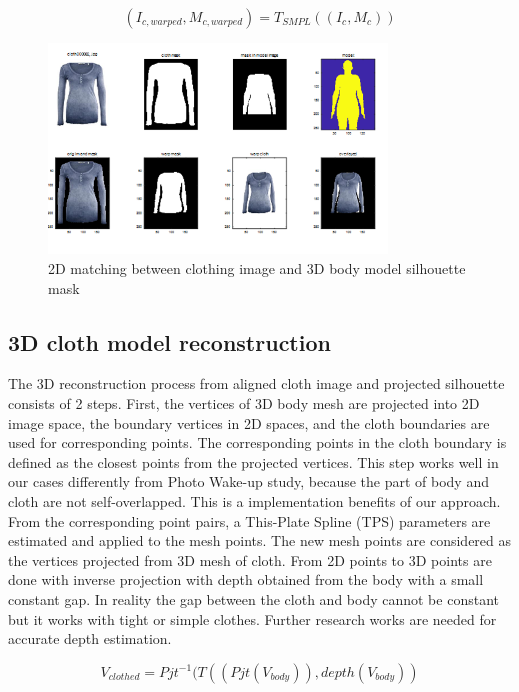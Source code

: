 \begin{equation}
(I_{c, warped}, M_{c, warped})  = T_{SMPL} ((I_c, M_c))
\end{equation}


\begin{figure}[t]
\centering
\includegraphics[width=9cm]{figures/2dmatching.png}   %
\caption{2D matching between clothing image and 3D body model silhouette mask}
\label{fig:2DmatchingOfClothAndBody}
\end{figure}


\subsection{3D cloth model reconstruction }


The 3D reconstruction process from aligned cloth image and projected silhouette consists of 2 steps. First, the vertices of 3D body mesh are projected into 2D image space, the boundary vertices in 2D spaces, and the cloth boundaries are used for corresponding points. The corresponding points in the cloth boundary is defined as the closest points from the projected vertices. This step works well in our cases differently from Photo Wake-up\cite{Weng2018PhotoW3} study, because the part of body and cloth are not self-overlapped. This is a implementation benefits of our approach. From the corresponding point pairs, a This-Plate Spline (TPS)\cite{Bookstein1989PrincipalWT} parameters are estimated and applied to the mesh points. The new mesh points are considered as the vertices projected from 3D mesh of cloth. From 2D points to 3D points are done with inverse projection with depth obtained from the body with a small constant gap. In reality the gap between the cloth and body cannot be constant but it works with tight or simple clothes. Further research works are needed for accurate depth estimation.   


\begin{equation}
V_{clothed} = Pjt^{-1} ( T( (Pjt(V_{body})), depth(V_{body}) )
\end{equation}


